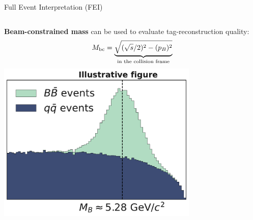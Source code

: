 \documentclass[xcolor=dvipsnames]{beamer}
\begin{document}
\begin{frame}{Full Event Interpretation (FEI)}
\vspace{10pt}

\begin{columns}
   \centering
   \textbf{Beam-constrained mass} can be used to evaluate tag-reconstruction quality:
   \vspace{-5pt}
   \begin{equation*}
   {\ensuremath{M_{\mathrm{bc}}}} = \underbrace{\sqrt{(\sqrt{s}/2)^2 - (p_B)^2}}_{\text{in the collision frame}}
   \end{equation*}
   \centering
   \includegraphics[width=0.72\textwidth]{figures/Mbc_mock_figure.pdf}
\end{columns}



\end{frame}
\end{document}
